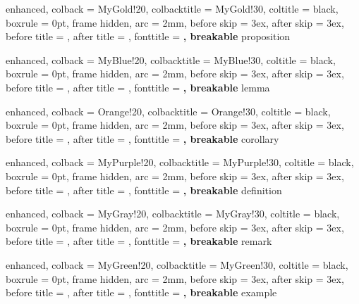 %
  {enhanced,
   colback        = MyGold!20,
   colbacktitle   = MyGold!30,
   coltitle       = black,
   boxrule        = 0pt,
   frame hidden,
   arc            = 2mm,
   before skip    = 3ex,
   after skip     = 3ex,
   before title   = {\vspace{2mm}},
   after title    = {\vspace{2mm}},
   fonttitle      = \bfseries\sffamily,
   breakable
  }{proposition}

%
  {enhanced,
   colback        = MyBlue!20,
   colbacktitle   = MyBlue!30,
   coltitle       = black,
   boxrule        = 0pt,
   frame hidden,
   arc            = 2mm,
   before skip    = 3ex,
   after skip     = 3ex,
   before title   = {\vspace{2mm}},
   after title    = {\vspace{2mm}},
   fonttitle      = \bfseries\sffamily,
   breakable
  }{lemma}

%
  {enhanced,
   colback        = Orange!20,
   colbacktitle   = Orange!30,
   coltitle       = black,
   boxrule        = 0pt,
   frame hidden,
   arc            = 2mm,
   before skip    = 3ex,
   after skip     = 3ex,
   before title   = {\vspace{2mm}},
   after title    = {\vspace{2mm}},
   fonttitle      = \bfseries\sffamily,
   breakable
  }{corollary}

%
  {enhanced,
   colback        = MyPurple!20,
   colbacktitle   = MyPurple!30,
   coltitle       = black,
   boxrule        = 0pt,
   frame hidden,
   arc            = 2mm,
   before skip    = 3ex,
   after skip     = 3ex,
   before title   = {\vspace{2mm}},
   after title    = {\vspace{2mm}},
   fonttitle      = \bfseries\sffamily,
   breakable
  }{definition}

%
  {enhanced,
   colback        = MyGray!20,
   colbacktitle   = MyGray!30,
   coltitle       = black,
   boxrule        = 0pt,
   frame hidden,
   arc            = 2mm,
   before skip    = 3ex,
   after skip     = 3ex,
   before title   = {\vspace{2mm}},
   after title    = {\vspace{2mm}},
   fonttitle      = \bfseries\sffamily,
   breakable
  }{remark}

%
  {enhanced,
   colback        = MyGreen!20,
   colbacktitle   = MyGreen!30,
   coltitle       = black,
   boxrule        = 0pt,
   frame hidden,
   arc            = 2mm,
   before skip    = 3ex,
   after skip     = 3ex,
   before title   = {\vspace{2mm}},
   after title    = {\vspace{2mm}},
   fonttitle      = \bfseries\sffamily,
   breakable
  }{example}

